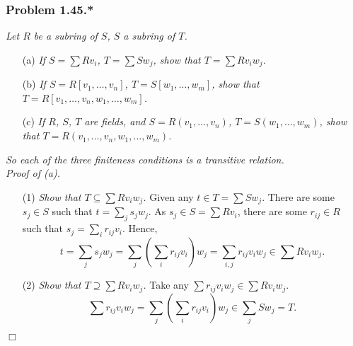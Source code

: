 \documentclass{article}
\begin{document}



\subsubsection*{Problem 1.45.*}
\emph{Let $R$ be a subring of $S$, $S$ a subring of $T$.}
\begin{enumerate}
\item[(a)]
  \emph{If $S = \sum R v_i$, $T = \sum S w_j$, show that $T = \sum R v_i w_j$.}

\item[(b)]
  \emph{If $S = R[v_1,\ldots,v_n]$, $T = S[w_1,\ldots,w_m]$,
  show that $T = R[v_1,\ldots,v_n,w_1,\ldots,w_m]$.}

\item[(c)]
  \emph{If $R$, $S$, $T$ are fields, and $S = R(v_1,\ldots,v_n)$, $T = S(w_1,\ldots,w_m)$,
  show that $T = R(v_1,\ldots,v_n,w_1,\ldots,w_m)$.}
\end{enumerate}
\emph{So each of the three finiteness conditions is a transitive relation.} \\



\emph{Proof of (a).}
\begin{enumerate}
\item[(1)]
  \emph{Show that $T \subseteq \sum R v_i w_j$.}
  Given any $t \in T = \sum S w_j$.
  There are some $s_j \in S$ such that $t = \sum_{j} s_j w_j$.
  As $s_j \in S = \sum R v_i$, there are some $r_{ij} \in R$ such that $s_j = \sum_{i} r_{ij} v_i$.
  Hence,
  \[
    t
    = \sum_{j} s_j w_j
    = \sum_{j} \left(\sum_{i} r_{ij} v_i\right) w_j
    = \sum_{i,j} r_{ij} v_i w_j
    \in \sum R v_i w_j.
  \]

\item[(2)]
  \emph{Show that $T \supseteq \sum R v_i w_j$.}
  Take any $\sum r_{ij} v_i w_j \in \sum R v_i w_j$.
  \[
    \sum r_{ij} v_i w_j
    = \sum_{j} \left(\sum_{i} r_{ij} v_i\right) w_j
    \in \sum_{j} S w_j = T.
  \]

\end{enumerate}
$\Box$ \\
\end{document}
